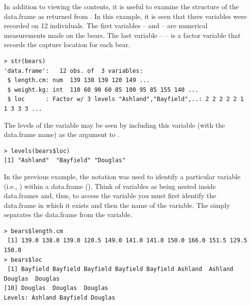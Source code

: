 \documentclass[10pt,openany]{book}\usepackage[]{graphicx}\usepackage[]{color}
\makeatletter
\newenvironment{kframe}{%
 \def\at@end@of@kframe{}%
 \ifinner\ifhmode%
  \def\at@end@of@kframe{\end{minipage}}%
  \begin{minipage}{\columnwidth}%
 \fi\fi%
 \def\FrameCommand##1{\hskip\@totalleftmargin \hskip-\fboxsep
 \colorbox{shadecolor}{##1}\hskip-\fboxsep
     \hskip-\linewidth \hskip-\@totalleftmargin \hskip\columnwidth}%
 \MakeFramed {\advance\hsize-\width
   \@totalleftmargin\z@ \linewidth\hsize
   \@setminipage}}%
 {\par\unskip\endMakeFramed%
 \at@end@of@kframe}
\newenvironment{knitrout}{}{} %
\makeatother
\begin{document}
In addition to viewing the contents, it is useful to examine the structure of the data.frame as returned from . In this example, it is seen that three variables were recorded on 12 individuals. The first variables --  and  -- are numerical measurements made on the bears. The last variable --  -- is a factor variable that records the capture location for each bear.
\begin{knitrout}
\color{fgcolor}\begin{kframe}
\begin{verbatim}
> str(bears)
'data.frame':	12 obs. of  3 variables:
 $ length.cm: num  139 138 139 120 149 ...
 $ weight.kg: int  110 60 90 60 85 100 95 85 155 140 ...
 $ loc      : Factor w/ 3 levels "Ashland","Bayfield",..: 2 2 2 2 2 1 1 3 3 3 ...
\end{verbatim}
\end{kframe}
\end{knitrout}
The levels of the  variable may be seen by including this variable (with the data.frame name) as the argument to .
\begin{knitrout}
\color{fgcolor}\begin{kframe}
\begin{verbatim}
> levels(bears$loc)
[1] "Ashland"  "Bayfield" "Douglas" 
\end{verbatim}
\end{kframe}
\end{knitrout}

In the previous example, the \R{\$} notation was used to identify a particular variable (i.e., ) within a data.frame (). Think of variables as being nested inside data.frames and, thus, to access the variable you must first identify the data.frame in which it exists and then the name of the variable. The \R{\$} simply separates the data.frame from the variable.
\begin{knitrout}
\color{fgcolor}\begin{kframe}
\begin{verbatim}
> bears$length.cm
 [1] 139.0 138.0 139.0 120.5 149.0 141.0 141.0 150.0 166.0 151.5 129.5 150.0
> bears$loc
 [1] Bayfield Bayfield Bayfield Bayfield Bayfield Ashland  Ashland  Douglas  Douglas 
[10] Douglas  Douglas  Douglas 
Levels: Ashland Bayfield Douglas
\end{verbatim}
\end{kframe}
\end{knitrout}
\end{document}
